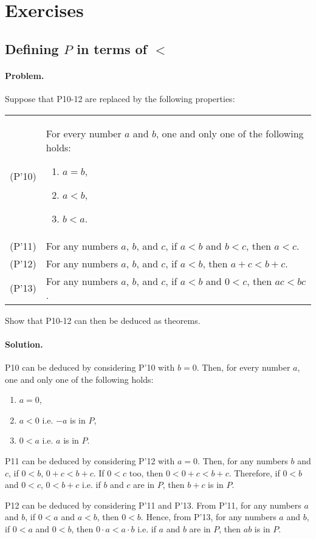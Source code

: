 \documentclass{article}
\begin{document}
\section{Exercises}

\setcounter{subsection}{7}
\subsection{Defining $P$ in terms of $<$}

\paragraph{Problem.} Suppose that P10-12 are replaced by the following properties:

\begin{tabular}{l p{4in}}
  (P'10) & For every number $a$ and $b$, one and only one of the following holds: \begin{enumerate}
      \itemsep0em
      \item $a = b$,
      \item $a < b$,
      \item $b < a$. \label{p'10}
    \end{enumerate} \\
  (P'11) & For any numbers $a$, $b$, and $c$, if $a < b$ and $b < c$, then $a < c$. \label{p'11} \\
  (P'12) & For any numbers $a$, $b$, and $c$, if $a < b$, then $a + c < b + c$. \label{p'12} \\
  (P'13) & For any numbers $a$, $b$, and $c$, if $a < b$ and $0 < c$, then $ac < bc$. \label{p'13} \\
\end{tabular}

Show that P10-12 can then be deduced as theorems.

\paragraph{Solution.} P10 can be deduced by considering P'10 with $b = 0$. Then, for every number $a$, one and only one of the following holds: \begin{enumerate}
    \itemsep0em
    \item $a = 0$,
    \item $a < 0$ i.e. $-a$ is in $P$,
    \item $0 < a$ i.e. $a$ is in $P$.
\end{enumerate}

P11 can be deduced by considering P'12 with $a = 0$. Then, for any numbers $b$ and $c$, if $0 < b$, $0 + c < b + c$. If $0 < c$ too, then $0 < 0 + c < b + c$. Therefore, if $0 < b$ and $0 < c$, $0 < b + c$ i.e. if $b$ and $c$ are in $P$, then $b + c$ is in $P$.

P12 can be deduced by considering P'11 and P'13. From P'11, for any numbers $a$ and $b$, if $0 < a$ and $a < b$, then $0 < b$. Hence, from P'13, for any numbers $a$ and $b$, if $0 < a$ and $0 < b$, then $0 \cdot a < a \cdot b$ i.e. if $a$ and $b$ are in $P$, then $ab$ is in $P$.
\end{document}
